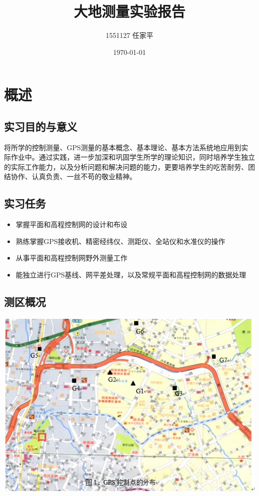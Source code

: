 \documentclass[a4paper,16pt,UTF8]{article}
\begin{document}
\title{\Huge 大地测量实验报告}
\author{1551127 任家平}
\date{\today}
\maketitle

\newpage

\section{\LARGE 概述}

\subsection{\Large 实习目的与意义}
将所学的控制测量、GPS测量的基本概念、基本理论、基本方法系统地应用到实际作业中。通过实践，进一步加深和巩固学生所学的理论知识，同时培养学生独立的实际工作能力，以及分析问题和解决问题的能力，更要培养学生的吃苦耐劳、团结协作、认真负责、一丝不苟的敬业精神。

\subsection{\Large 实习任务}
\begin{itemize}
    \item 掌握平面和高程控制网的设计和布设
    \item 熟练掌握GPS接收机、精密经纬仪、测距仪、全站仪和水准仪的操作
    \item 从事平面和高程控制网野外测量工作
    \item 能独立进行GPS基线、网平差处理，以及常规平面和高程控制网的数据处理
\end{itemize}

\subsection{\Large 测区概况}
\begin{center}
    \includegraphics[height = 9 cm]{cequ.jpg}
\end{center}
\end{document}
